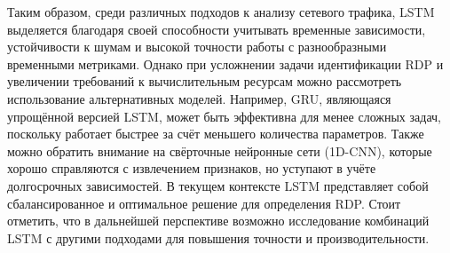 \documentclass[bachelor, och, coursework]{SCWorks}
\begin{document}





  Таким образом, среди различных подходов к анализу сетевого трафика, LSTM выделяется благодаря своей способности учитывать временные 
  зависимости, устойчивости к шумам и высокой точности работы с разнообразными временными метриками. Однако при усложнении задачи 
  идентификации RDP и увеличении требований к вычислительным ресурсам можно рассмотреть использование альтернативных моделей. 
  Например, GRU, являющаяся упрощённой версией LSTM, может быть эффективна для менее сложных задач, поскольку работает быстрее 
  за счёт меньшего количества параметров. Также можно обратить внимание на свёрточные нейронные сети (1D-CNN), которые хорошо 
  справляются с извлечением признаков, но уступают в учёте долгосрочных зависимостей. В текущем контексте LSTM представляет собой 
  сбалансированное и оптимальное решение для определения RDP. Стоит отметить, что в дальнейшей перспективе возможно 
  исследование комбинаций LSTM с другими подходами для повышения точности и производительности.
\end{document}
